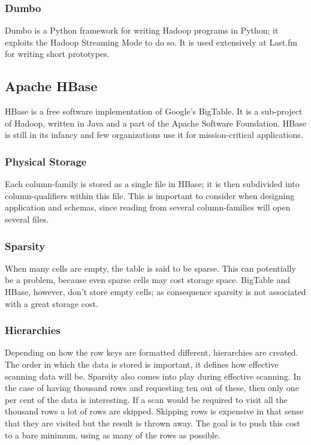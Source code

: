 \subsubsection{Dumbo}

Dumbo is a Python framework for writing Hadoop programs in Python; it exploits
the Hadoop Streaming Mode to do so. It is used extensively at Last.fm for
writing short prototypes. \cite{dumbo}


\subsection{Apache HBase}

HBase is a free software implementation of Google's BigTable. \cite{bigtable} It
is a sub-project of Hadoop, written in Java and a part of the Apache Software
Foundation. HBase is still in its infancy and few organizations use it for
mission-critical applications. \cite{hbase}


\subsubsection{Physical Storage}

Each column-family is stored as a single file in HBase; it is then subdivided
into column-qualifiers within this file. This is important to consider when
designing application and schemas, since reading from several column-families
will open several files.


\subsubsection{Sparsity}

When many cells are empty, the table is said to be sparse. This can potentially
be a problem, because even sparse cells may cost storage space.  BigTable and
HBase, however, don't store empty cells; as consequence sparsity is not
associated with a great storage cost.
\cite{olap_data_scalability,olap_solutions}


\subsubsection{Hierarchies}

Depending on how the row keys are formatted different, hierarchies are created.
The order in which the data is stored is important, it defines how effective
scanning data will be. Sparsity also comes into play during effective scanning.
In the case of having thousand rows and requesting ten out of these, then only
one per cent of the data is interesting. If a scan would be required to visit
all the thousand rows a lot of rows are skipped. Skipping rows is expensive in
that sense that they are visited but the result is thrown away. The goal is to
push this cost to a bare minimum, using as many of the rows as possible.

